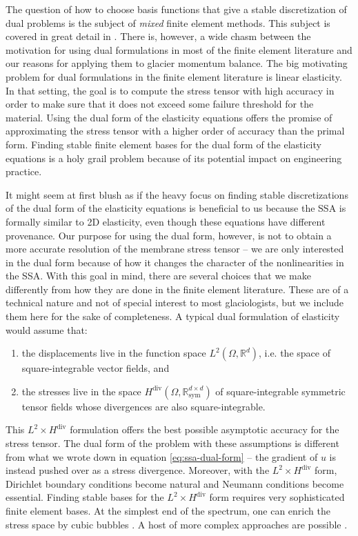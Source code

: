 \documentclass[review,oneside]{igs}
\begin{document}
The question of how to choose basis functions that give a stable discretization of dual problems is the subject of \emph{mixed} finite element methods.
This subject is covered in great detail in \citet{boffi2013mixed}.
There is, however, a wide chasm between the motivation for using dual formulations in most of the finite element literature and our reasons for applying them to glacier momentum balance.
The big motivating problem for dual formulations in the finite element literature is linear elasticity.
In that setting, the goal is to compute the stress tensor with high accuracy in order to make sure that it does not exceed some failure threshold for the material.
Using the dual form of the elasticity equations offers the promise of approximating the stress tensor with a higher order of accuracy than the primal form.
Finding stable finite element bases for the dual form of the elasticity equations is a holy grail problem because of its potential impact on engineering practice.

It might seem at first blush as if the heavy focus on finding stable discretizations of the dual form of the elasticity equations is beneficial to us because the SSA is formally similar to 2D elasticity, even though these equations have different provenance.
Our purpose for using the dual form, however, is not to obtain a more accurate resolution of the membrane stress tensor -- we are only interested in the dual form because of how it changes the character of the nonlinearities in the SSA.
With this goal in mind, there are several choices that we make differently from how they are done in the finite element literature.
These are of a technical nature and not of special interest to most glaciologists, but we include them here for the sake of completeness.
A typical dual formulation of elasticity would assume that:
\begin{enumerate}
    \item the displacements live in the function space $L^2(\Omega, \mathbb{R}^d)$, i.e. the space of square-integrable vector fields, and
    \item the stresses live in the space $H^{\text{div}}(\Omega, \mathbb{R}_{\text{sym}}^{d \times d})$ of square-integrable symmetric tensor fields whose divergences are also square-integrable.
\end{enumerate}
This $L^2 \times H^{\text{div}}$ formulation offers the best possible asymptotic accuracy for the stress tensor.
The dual form of the problem with these assumptions is different from what we wrote down in equation \eqref{eq:ssa-dual-form} -- the gradient of $u$ is instead pushed over as a stress divergence.
Moreover, with the $L^2 \times H^{\text{div}}$ form, Dirichlet boundary conditions become natural and Neumann conditions become essential.
Finding stable bases for the $L^2\times H^{\text{div}}$ form requires very sophisticated finite element bases.
At the simplest end of the spectrum, one can enrich the stress space by cubic bubbles \citep{brezzi1993mixed}.
A host of more complex approaches are possible \citep{arnold1984peers, arnold2002mixed}.
\end{document}
